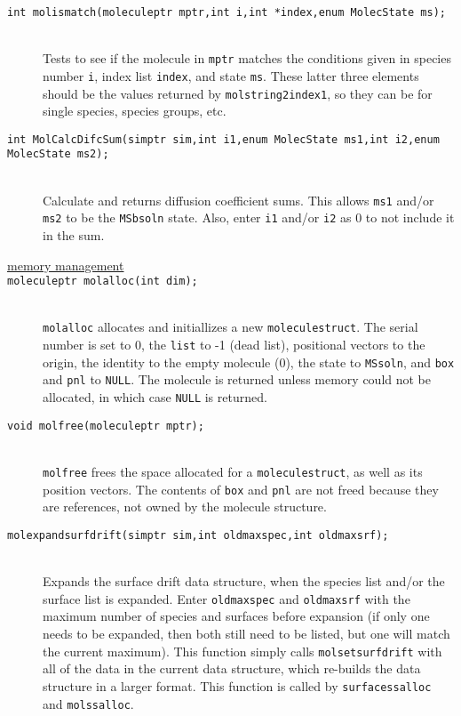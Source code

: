 \documentclass {book}
\begin{document}
\begin{description}
\item[\texttt{int molismatch(moleculeptr mptr,int i,int *index,enum MolecState ms);}]
\hfill \\
Tests to see if the molecule in \texttt{mptr} matches the conditions given in species number \texttt{i}, index list \texttt{index}, and state \texttt{ms}.  These latter three elements should be the values returned by \texttt{molstring2index1}, so they can be for single species, species groups, etc.

\item[\texttt{int MolCalcDifcSum(simptr sim,int i1,enum MolecState ms1,int i2,enum MolecState ms2);}]
\hfill \\
Calculate and returns diffusion coefficient sums.  This allows \texttt{ms1} and/or \texttt{ms2} to be the \texttt{MSbsoln} state.  Also, enter \texttt{i1} and/or \texttt{i2} as 0 to not include it in the sum.

\item[\underline{memory management}]

\item[\texttt{moleculeptr molalloc(int dim);}]
\hfill \\
\texttt{molalloc} allocates and initiallizes a new \texttt{moleculestruct}.  The serial number is set to 0, the \texttt{list} to -1 (dead list), positional vectors to the origin, the identity to the empty molecule (0), the state to \texttt{MSsoln}, and \texttt{box} and \texttt{pnl} to \texttt{NULL}.  The molecule is returned unless memory could not be allocated, in which case \texttt{NULL} is returned.

\item[\texttt{void molfree(moleculeptr mptr);}]
\hfill \\
\texttt{molfree} frees the space allocated for a \texttt{moleculestruct}, as well as its position vectors.  The contents of \texttt{box} and \texttt{pnl} are not freed because they are references, not owned by the molecule structure.

\item[\texttt{molexpandsurfdrift(simptr sim,int oldmaxspec,int oldmaxsrf);}]
\hfill \\
Expands the surface drift data structure, when the species list and/or the surface list is expanded.  Enter \texttt{oldmaxspec} and \texttt{oldmaxsrf} with the maximum number of species and surfaces before expansion (if only one needs to be expanded, then both still need to be listed, but one will match the current maximum).  This function simply calls \texttt{molsetsurfdrift} with all of the data in the current data structure, which re-builds the data structure in a larger format.  This function is called by \texttt{surfacessalloc} and \texttt{molssalloc}.


\end{description}
\end{document}
